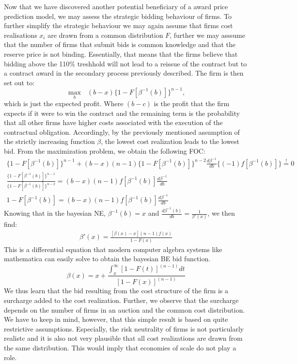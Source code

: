 \documentclass[a4paper,12pt, headsepline]{scrartcl}
\numberwithin{equation}{section}
\begin{document}
Now that we have discovered another potential beneficiary of a award price prediction model, we may assess the strategic bidding behaviour of firms. To further simplify the strategic behaviour we may again assume that firms cost realisations $x_i$ are drawn from a common distribution $F$, further we may asssume that the number of firms that submit bids is common knowledge and that the reserve price is not binding. Essentially, that means that the firms believe that bidding above the 110\% treshhold will not lead to a reissue of the contract but to a contract award in the secondary process previously described.
The firm is then set out to:
\[
\max_b \text{ } (b - x)\{1 - F[\beta^{-1}(b)]\}^{n-1},
\]
which is just the expected profit. Where $(b - c)$ is the profit that the firm expects if it were to win the contract and the remaining term is the probability that all other firms have higher costs associated with the execution of the contractual obligation. Accordingly, by the previously mentioned assumption of the strictly increasing function $\beta$, the lowest cost realization leads to the lowest bid. From the maximization problem, we obtain the following FOC:
\begin{gather*}
	\{1-F[\beta^{-1}(b)]\}^{n-1} + (b - x)(n - 		1)\{1-F[\beta^{-1}(b)]\}^{n-2}\frac{d\beta^{-1}}{db}\{(-1)f[\beta^{-1}(b)]\} \overset{!}{=} 0\\
	\frac{\{1-F[\beta^{-1}(b)]\}^{n-1}}{\{1-F[\beta^{-1}(b)]\}^{n-2}} = (b - x)(n - 1)f[\beta^{-1}(b)]\frac{d\beta^{-1}}{db}\\
	1-F[\beta^{-1}(b)] = (b - x)(n - 1)f[\beta^{-1}(b)]\frac{d\beta^{-1}}{db}
\end{gather*}
Knowing that in the bayesian NE, $\beta^{-1}(b) = x$ and $\frac{d\beta^{-1}(b)}{db} = \frac{1}{\beta'(x)}$, we then find:
\begin{gather*}
	\beta'(x) = \frac{[\beta(x) - x](n - 1)f(x)}{1-F(x)}
\end{gather*}
This is a differential equation that modern computer algebra systems like mathematica can easily solve to obtain the bayesian BE bid function.
\[
\beta(x) = x + \frac{\int_x^\infty [1 - F(t)]^{(n-1)}dt}{[1-F(x)]^{(n-1)}}
\]
We thus learn that the bid resulting from the cost structure of the firm is a surcharge added to the cost realization. Further, we observe that the surcharge depends on the number of firms in an auction and the common cost distribution. We have to keep in mind, however, that this simple result is based on quite restrictive assumptions. Especially, the risk neutrality of firms is not particularly realistc and it is also not very plausible that all cost realizations are drawn from the same distribution. This would imply that economies of scale do not play a role. 
\end{document}
